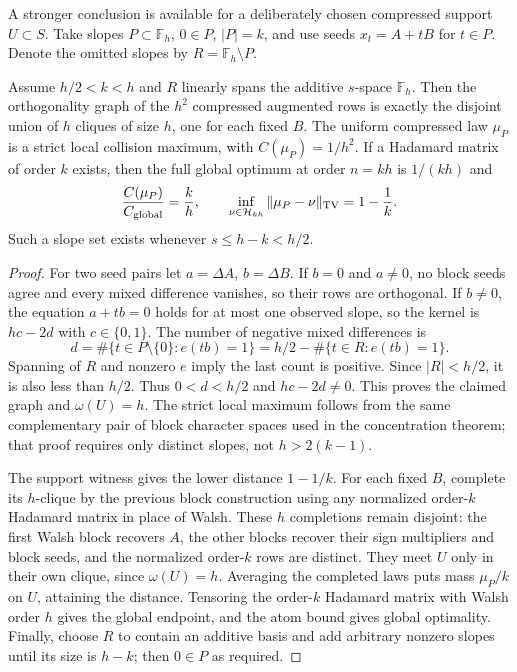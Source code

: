 A stronger conclusion is available for a deliberately chosen compressed
support $U\subset S$. Take slopes $P\subset\mathbb F_h$, $0\in P$,
$|P|=k$, and use seeds $x_t=A+tB$ for $t\in P$. Denote the omitted
slopes by $R=\mathbb F_h\setminus P$.
\begin{theorem}
\label{thm:design-spanning-slopes}
Assume $h/2<k<h$ and $R$ linearly spans the additive $s$-space
$\mathbb F_h$. Then the orthogonality graph of the $h^2$ compressed
augmented rows is exactly the disjoint union of $h$ cliques of size $h$,
one for each fixed $B$.
The uniform compressed law $\mu_P$ is a strict local collision maximum,
with $C(\mu_P)=1/h^2$.
If a Hadamard matrix of order $k$ exists, then the full global optimum
at order $n=kh$ is $1/(kh)$ and
\[
 \frac{C(\mu_P)}{C_{\rm global}}=\frac{k}{h},\qquad
 \inf_{\nu\in\mathcal H_{kh}}\|\mu_P-\nu\|_{\rm TV}=1-\frac1k.
\]
Such a slope set exists whenever $s\le h-k<h/2$.
\end{theorem}
\begin{proof}
For two seed pairs let $a=\Delta A$, $b=\Delta B$.
If $b=0$ and $a\ne0$, no block seeds agree and every mixed difference
vanishes, so their rows are orthogonal. If $b\ne0$, the equation
$a+tb=0$ holds for at most one observed slope, so the kernel is
$h c-2d$ with $c\in\{0,1\}$. The number of negative mixed differences is
\[
 d=\#\{t\in P\setminus\{0\}:e(tb)=1\}
   =h/2-\#\{t\in R:e(tb)=1\}.
\]
Spanning of $R$ and nonzero $e$ imply the last count is positive.
Since $|R|<h/2$, it is also less than $h/2$. Thus $0<d<h/2$ and
$hc-2d\ne0$. This proves the claimed graph and $\omega(U)=h$.
The strict local maximum follows from the same complementary pair of
block character spaces used in the concentration theorem; that proof
requires only distinct slopes, not $h>2(k-1)$.

The support witness gives the lower distance $1-1/k$. For each fixed
$B$, complete its $h$-clique by the previous block construction using
any normalized order-$k$ Hadamard matrix in place of Walsh. These $h$
completions remain disjoint: the first Walsh block recovers $A$, the
other blocks recover their sign multipliers and block seeds, and the
normalized order-$k$ rows are distinct. They meet $U$ only in their
own clique, since $\omega(U)=h$. Averaging the completed laws puts
mass $\mu_P/k$ on $U$, attaining the distance. Tensoring the order-$k$
Hadamard matrix with Walsh order $h$ gives the global endpoint, and
the atom bound gives global optimality. Finally, choose $R$ to contain
an additive basis and add arbitrary nonzero slopes until its size is
$h-k$; then $0\in P$ as required.
\end{proof}

